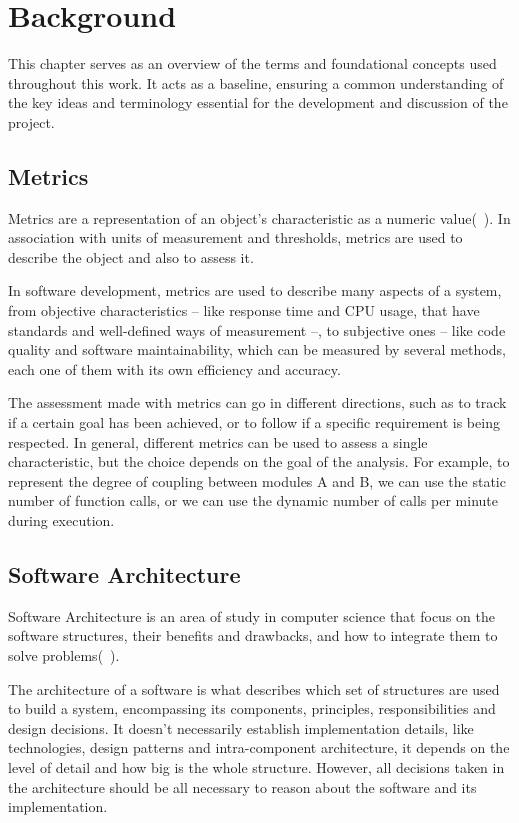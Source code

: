 \chapter{Background}
\label{cap:literature}

\enlargethispage{.5\baselineskip}

This chapter serves as an overview of the terms and foundational concepts used throughout this work. It acts as a baseline, ensuring a common understanding of the key ideas and terminology essential for the development and discussion of the project.

\section{Metrics}
\label{sec:metrics}
Metrics are a representation of an object’s characteristic as a numeric value(~\cite{OOMetrics}). In association with units of measurement and thresholds, metrics are used to describe the object and also to assess it.

In software development, metrics are used to describe many aspects of a system, from objective characteristics – like response time and CPU usage, that have standards and well-defined ways of measurement –, to subjective ones – like code quality and software maintainability, which can be measured by several methods, each one of them with its own efficiency and accuracy.

The assessment made with metrics can go in different directions, such as to track if a certain goal has been achieved, or to follow if a specific requirement is being respected. In general, different metrics can be used to assess a single characteristic, but the choice depends on the goal of the analysis. For example, to represent the degree of coupling between modules A and B, we can use the static number of function calls, or we can use the dynamic number of calls per minute during execution.

\section{Software Architecture}
\label{sec:softarq}
Software Architecture is an area of study in computer science that focus on the software structures, their benefits and drawbacks, and how to integrate them to solve problems(~\cite{SoftArch}).

The architecture of a software is what describes which set of structures are used to build a system, encompassing its components, principles, responsibilities and design decisions. It doesn't necessarily establish implementation details, like technologies, design patterns and intra-component architecture, it depends on the level of detail and how big is the whole structure. However, all decisions taken in the architecture should be all necessary to reason about the software and its implementation.

